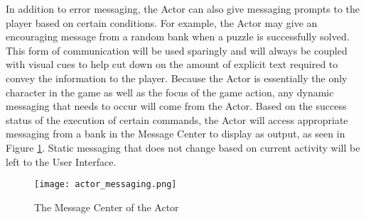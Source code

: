 In addition to error messaging, the Actor can also give messaging prompts to the player based on certain conditions. For example, the Actor may give an encouraging message from a random bank when a puzzle is successfully solved. This form of communication will be used sparingly and will always be coupled with visual cues to help cut down on the amount of explicit text required to convey the information to the player. Because the Actor is essentially the only character in the game as well as the focus of the game action, any dynamic messaging that needs to occur will come from the Actor. Based on the success status of the execution of certain commands, the Actor will access appropriate messaging from a bank in the Message Center to display as output, as seen in Figure \ref{fig:actor_messaging}. Static messaging that does not change based on current activity will be left to the User Interface.\\

\begin{figure}[h]
  \caption{The Message Center of the Actor}
  \label{fig:actor_messaging}
  \centering
  \texttt{[image: actor\_messaging.png]}
\end{figure}